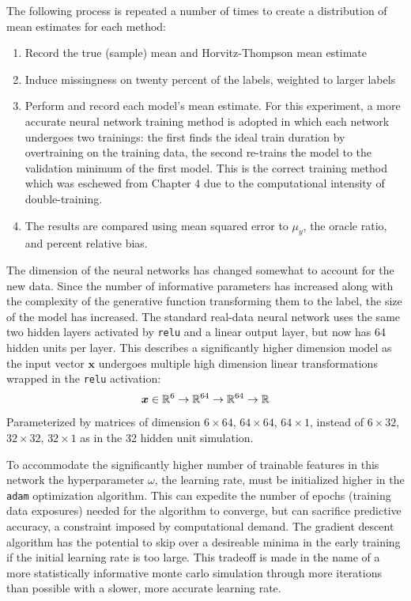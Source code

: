 \documentclass[12pt,twoside]{reedthesis}
\providecommand{\tightlist}{%
  \setlength{\itemsep}{0pt}\setlength{\parskip}{0pt}}
\begin{document}
The following process is repeated a number of times to create a
distribution of mean estimates for each method:
\begin{enumerate}
\def\labelenumi{\arabic{enumi}.}
\tightlist
\item
  Record the true (sample) mean and Horvitz-Thompson mean estimate
\item
  Induce missingness on twenty percent of the labels, weighted to larger
  labels
\item
  Perform and record each model's mean estimate. For this experiment, a
  more accurate neural network training method is adopted in which each
  network undergoes two trainings: the first finds the ideal train
  duration by overtraining on the training data, the second re-trains
  the model to the validation minimum of the first model. This is the
  correct training method which was eschewed from Chapter 4 due to the
  computational intensity of double-training.
\item
  The results are compared using mean squared error to \(\mu_y\), the
  oracle ratio, and percent relative bias.
\end{enumerate}
The dimension of the neural networks has changed somewhat to account for
the new data. Since the number of informative parameters has increased
along with the complexity of the generative function transforming them
to the label, the size of the model has increased. The standard
real-data neural network uses the same two hidden layers activated by
\texttt{relu} and a linear output layer, but now has 64 hidden units per
layer. This describes a significantly higher dimension model as the
input vector \(\boldsymbol{x}\) undergoes multiple high dimension linear
transformations wrapped in the \texttt{relu} activation: \[
\boldsymbol{x} \in \mathbb{R}^6 \\
\rightarrow \mathbb{R}^{64} \\
\rightarrow \mathbb{R}^{64} \rightarrow \mathbb{R}
\] Parameterized by matrices of dimension \(6 \times 64\),
\(64 \times 64\), \(64 \times 1\), instead of \(6 \times 32\),
\(32 \times 32\), \(32 \times 1\) as in the 32 hidden unit simulation.

To accommodate the significantly higher number of trainable features in
this network the hyperparameter \(\omega\), the learning rate, must be
initialized higher in the \texttt{adam} optimization algorithm. This can
expedite the number of epochs (training data exposures) needed for the
algorithm to converge, but can sacrifice predictive accuracy, a
constraint imposed by computational demand. The gradient descent
algorithm has the potential to skip over a desireable minima in the
early training if the initial learning rate is too large. This tradeoff
is made in the name of a more statistically informative monte carlo
simulation through more iterations than possible with a slower, more
accurate learning rate.
\end{document}

